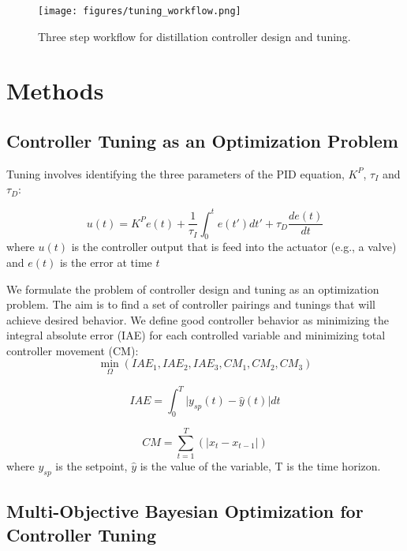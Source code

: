 \begin{figure}
    \centering
    \texttt{[image: figures/tuning\_workflow.png]}
    \caption{Three step workflow for distillation controller design and tuning. }
    \label{fig:tuning_workflow}
\end{figure}

\section{Methods}

\subsection{Controller Tuning as an Optimization Problem}

Tuning involves identifying the three parameters of the PID equation, $K^P$, $\tau_I$ and $\tau_D$:

\begin{equation}
    \label{eq:PID_defining_equation}
    u(t) = K^P e(t) + \frac{1}{\tau_I}\int_0^t e(t')dt' + \tau_D \frac{de(t)}{dt}
\end{equation}
where $u(t)$ is the controller output that is feed into the actuator (e.g., a valve) and $e(t)$ is the error at time $t$

We formulate the problem of controller design and tuning as an optimization problem. The aim is to find a set of controller pairings and tunings that will achieve desired behavior. We define good controller behavior as minimizing the integral absolute error (IAE) for each controlled variable and minimizing total controller movement (CM):
\begin{equation}
    \min_{\Omega}(IAE_1, IAE_2, IAE_3, CM_1, CM_2, CM_3)
\end{equation}

\begin{equation}
    IAE = \int_0^T \vert y_{sp}(t) - \hat y(t) \vert dt
\end{equation}

\begin{equation}
    CM = \sum_{t=1}^{T}( \vert x_t - x_{t-1} \vert)
\end{equation}
where $y_{sp}$ is the setpoint,  $\hat y$  is the value of  the variable, T is the time horizon. 

\subsection{Multi-Objective Bayesian Optimization for Controller Tuning}

